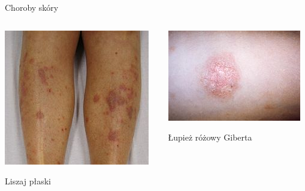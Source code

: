 \documentclass{beamer}
\begin{document}
\begin{frame}{Choroby skóry}

\begin{columns}
\begin{column}{0.5\textwidth}
\begin{center}
  \includegraphics[scale=1.5]{img/lichen_planus.jpg}

  Liszaj płaski
\end{center}
\end{column}
\begin{column}{0.5\textwidth}
\begin{center}
  \includegraphics[scale=1.5]{img/pityriasis_rosea.jpg}  

  Łupież różowy Giberta
\end{center}
\end{column}
\end{columns}
\end{frame}
\end{document}
